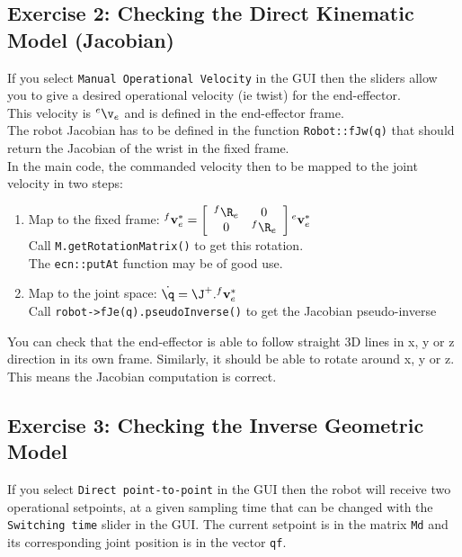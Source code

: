 \documentclass{ecnreport}
\begin{document}
\subsection*{Exercise 2: Checking the Direct Kinematic Model (Jacobian)}

If you select \texttt{Manual Operational Velocity} in the GUI then the sliders allow you to give a desired operational velocity (ie twist) for the end-effector.\\
This velocity is ${}^e\v_e$ and is defined in the end-effector frame.\\
The robot Jacobian has to be defined in the function \texttt{Robot::fJw(q)} that should return the Jacobian of the wrist in the fixed frame.\\


In the main code, the commanded velocity then to be mapped to the joint velocity in two steps:
\begin{enumerate}
	\item Map to the fixed frame: ${}^f\mathbf{v}_e^* = \left[\begin{array}{cc}{}^f\R_e & 0 \\ 0 & {}^f\R_e\end{array}\right]{}^e\mathbf{v}_e^*$\\
			Call \texttt{M.getRotationMatrix()} to get this rotation.\\
			The \texttt{ecn::putAt} function may be of good use.
	\item Map to the joint space: $\dot\q = \J^+.{}^f\mathbf{v}_e^*$\\
Call \texttt{robot->fJe(q).pseudoInverse()} to get the Jacobian pseudo-inverse
\end{enumerate}
You can check that the end-effector is able to follow straight 3D lines in x, y or z direction in its own frame.
Similarly, it should be able to rotate around x, y or z. This means the Jacobian computation is correct.

\newpage
\subsection*{Exercise 3: Checking the Inverse Geometric Model}

If you select \texttt{Direct point-to-point} in the GUI then the robot will receive two operational setpoints, at a given sampling time that can be changed with the \texttt{Switching time} slider in the GUI. The current setpoint is in the matrix \texttt{Md} and its corresponding joint position is in the vector \texttt{qf}. 
\end{document}
